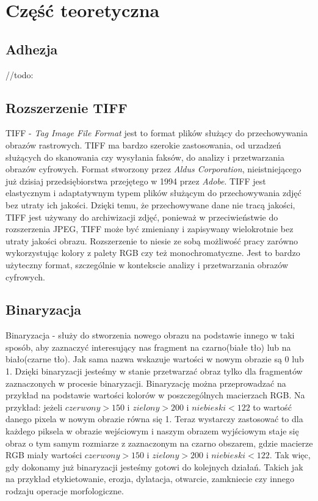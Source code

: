 \documentclass{article}
\begin{document}
    \section{Część teoretyczna}
        \subsection{Adhezja}
        {
            \Large
            \justifying
            \quad
            //todo:
        }
        \subsection{Rozszerzenie TIFF}
        {
            \Large
            \justifying
            \quad
            TIFF - \textit{Tag Image File Format} jest to format plików służący do przechowywania obrazów rastrowych.
            TIFF ma bardzo szerokie zastosowania, od urzadzeń służących do skanowania czy wysyłania faksów, do analizy i przetwarzania obrazów cyfrowych.
            Format stworzony przez \textit{Aldus Corporation}, nieistniejącego już dzisiaj przedsiębiorstwa przejętego w 1994 przez \textit{Adobe}.
            TIFF jest elastycznym i adaptatywnym typem plików służącym do przechowywania zdjęć bez utraty ich jakości.
            Dzięki temu, że przechowywane dane nie tracą jakości, TIFF jest używany do archiwizacji zdjęć, ponieważ w przeciwieństwie do rozszerzenia JPEG,
            TIFF może być zmieniany i zapisywany wielokrotnie bez utraty jakości obrazu.
            Rozszerzenie to niesie ze sobą możliwość pracy zarówno wykorzystując kolory z palety RGB czy też monochromatyczne.
            Jest to bardzo użyteczny format, szczególnie w kontekscie analizy i przetwarzania obrazów cyfrowych. \cite{encyclopediaofgraphicsfileformats}
        }
        \subsection{Binaryzacja}
        {
            \Large
            \justifying
            \quad
            Binaryzacja - służy do stworzenia nowego obrazu na podstawie innego w taki sposób, aby zaznaczyć interesujący nas fragment na czarno(białe tło)
            lub na biało(czarne tło). Jak sama nazwa wskazuje wartości w nowym obrazie są 0 lub 1. Dzięki binaryzacji jesteśmy w stanie przetwarzać obraz
            tylko dla fragmentów zaznaczonych w procesie binaryzacji. Binaryzację można przeprowadzać na przykład na podstawie wartości kolorów w poszczególnych
            macierzach RGB. Na przykład: 
            jeżeli \(czerwony > 150\) i \(zielony > 200\) i \(niebieski < 122\) to wartość danego pixela w nowym obrazie równa się 1.
            Teraz wystarczy zastosować to dla każdego piksela w obrazie wejściowym i naszym obrazem wyjściowym staje się obraz o tym samym rozmiarze
            z zaznaczonym na czarno obszarem, gdzie macierze RGB miały wartości \(czerwony > 150\) i \(zielony > 200\) i \(niebieski < 122\).
            Tak więc, gdy dokonamy już binaryzacji jesteśmy gotowi do kolejnych działań.
            Takich jak na przykład etykietowanie, erozja, dylatacja, otwarcie, zamkniecie czy innego rodzaju operacje morfologiczne. \cite{digitalimageprocessing}
        }
\end{document}
